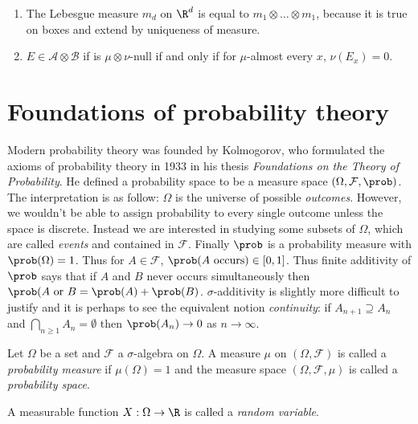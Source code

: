 \documentclass[a4paper]{article}
\renewcommand{\P}{\prob} %
\begin{document}
\begin{note}\leavevmode
  \begin{enumerate}
  \item The Lebesgue measure \(m_d\) on \(\R^d\) is equal to \(m_1 \otimes \dots \otimes m_1\), because it is true on boxes and extend by uniqueness of measure.
  \item \(E \in \mathcal A \otimes \mathcal B\) if is \(\mu \otimes \nu\)-null if and only if for \(\mu\)-almost every \(x\), \(\nu(E_x) = 0\).
  \end{enumerate}
\end{note}

\section{Foundations of probability theory}

Modern probability theory was founded by Kolmogorov, who formulated the axioms of probability theory in 1933 in his thesis \emph{Foundations on the Theory of Probability}. He defined a probability space to be a measure space \((\Omega, \mathcal F, \P)\). The interpretation is as follow: \(\Omega\) is the universe of possible \emph{outcomes}. However, we wouldn't be able to assign probability to every single outcome unless the space is discrete. Instead we are interested in studying some subsets of \(\Omega\), which are called \emph{events} and contained in \(\mathcal F\). Finally \(\P\) is a probability measure with \(\P(\Omega) = 1\). Thus for \(A \in \mathcal F\), \(\P(A \text{ occurs}) \in [0, 1]\). Thus finite additivity of \(\P\) says that if \(A\) and \(B\) never occurs simultaneously then \(\P(A \text{ or } B = \P(A) + \P(B)\). \(\sigma\)-additivity is slightly more difficult to justify and it is perhaps to see the equivalent notion \emph{continuity}: if \(A_{n + 1} \supseteq A_n\) and \(\bigcap_{n \geq 1} A_n = \emptyset\) then \(\P(A_n) \to 0\) as \(n \to \infty\).

\begin{definition}
  Let \(\Omega\) be a set and \(\mathcal F\) a \(\sigma\)-algebra on \(\Omega\). A measure \(\mu\) on \((\Omega, \mathcal F)\) is called a \emph{probability measure} if \(\mu(\Omega) = 1\) and the measure space \((\Omega, \mathcal F, \mu)\) is called a \emph{probability space}.
\end{definition}

\begin{definition}
  A measurable function \(X: \Omega \to \R\) is called a \emph{random variable}.
\end{definition}
\end{document}
